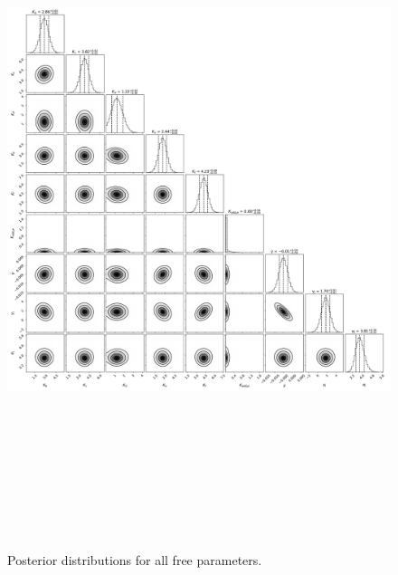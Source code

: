 \documentclass{emulateapj}
\begin{document}
 
\begin{figure}[!h]
\centering

\includegraphics[height=8.0in,width=6.0in,keepaspectratio]{TOI-1246_add_de_corner.pdf}
\caption{Posterior distributions for all free parameters.}
\end{figure} 

 
\end{document}
